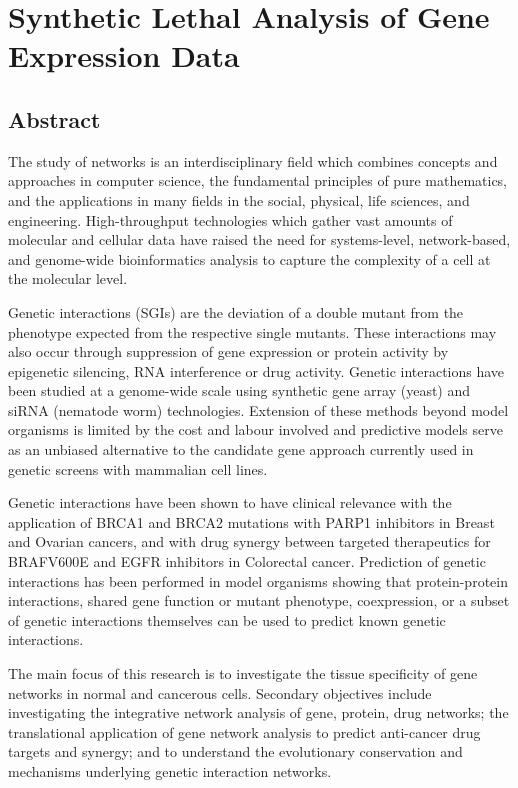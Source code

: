 \chapter{Synthetic Lethal Analysis of Gene Expression Data}
\label{chap:SLIPT}

\section{Abstract}

The study of networks is an interdisciplinary field which combines concepts and approaches in computer science, the fundamental principles of pure mathematics, and the applications in many fields in the social, physical, life sciences, and engineering. High-throughput technologies which gather vast amounts of molecular and cellular data have raised the need for systems-level, network-based, and genome-wide bioinformatics analysis to capture the complexity of a cell at the molecular level.

Genetic interactions (SGIs) are the deviation of a double mutant from the phenotype expected from the respective single mutants. These interactions may also occur through suppression of gene expression or protein activity by epigenetic silencing, RNA interference or drug activity. Genetic interactions have been 
studied at a genome-wide scale using synthetic gene array (yeast) and siRNA (nematode worm) technologies. Extension of these methods beyond model organisms is limited by the cost and labour involved and predictive models serve as an unbiased alternative to the candidate gene approach currently used in genetic screens with mammalian cell lines.

Genetic interactions have been shown to have clinical relevance with the application of BRCA1 and BRCA2 mutations with PARP1 inhibitors in Breast and Ovarian cancers, and with drug synergy between targeted therapeutics for BRAFV600E and EGFR inhibitors in Colorectal cancer. Prediction of genetic interactions has been performed in model organisms showing that protein-protein interactions, shared gene function or mutant phenotype, coexpression, or a subset of genetic interactions themselves can be used to predict known genetic interactions.

The main focus of this research is to investigate the tissue specificity of gene networks in normal and cancerous cells. Secondary objectives include investigating the integrative network analysis of gene, protein, drug networks; the translational application of gene network analysis to predict anti-cancer drug targets and synergy; and to understand the evolutionary conservation and mechanisms underlying genetic interaction networks.

